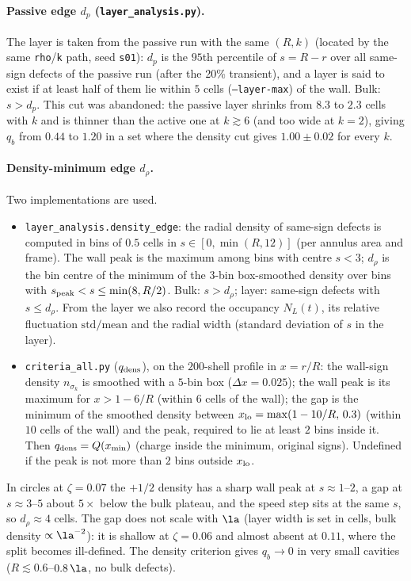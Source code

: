 \paragraph{Passive edge $d_p$ (\texttt{layer\_analysis.py}).}
The layer is taken from the passive run with the same $(R,k)$ (located by the same \texttt{rho}/\texttt{k}
path, seed \texttt{s01}): $d_p$ is the $95$th percentile of $s=R-r$ over all same-sign defects of the passive
run (after the 20\% transient), and a layer is said to exist if at least half of them lie within $5$ cells
(\texttt{--layer-max}) of the wall. Bulk: $s>d_p$. This cut was abandoned: the passive layer shrinks
from $8.3$ to $2.3$ cells with $k$ and is thinner than the active one at $k\gtrsim6$ (and too wide at $k=2$),
giving $q_b$ from $0.44$ to $1.20$ in a set where the density cut gives $1.00\pm0.02$ for every $k$.

\paragraph{Density-minimum edge $d_\rho$.}
Two implementations are used.
\begin{itemize}
  \item \texttt{layer\_analysis.density\_edge}: the radial density of same-sign defects is computed in
        bins of $0.5$ cells in $s\in[0,\min(R,12)]$ (per annulus area and frame). The wall peak is the
        maximum among bins with centre $s<3$; $d_\rho$ is the bin centre of the minimum of the $3$-bin box-smoothed
        density over bins with $s_{\rm peak}<s\le\min(8,R/2)$. Bulk: $s>d_\rho$; layer: same-sign defects with
        $s\le d_\rho$. From the layer we also record the occupancy $N_L(t)$, its relative fluctuation
        $\mathrm{std}/\mathrm{mean}$ and the radial width (standard deviation of $s$ in the layer).
  \item \texttt{criteria\_all.py} ($q_{\rm dens}$), on the $200$-shell profile in $x=r/R$: the wall-sign density
        $n_{\sigma_k}$ is smoothed with a $5$-bin box ($\Delta x=0.025$); the wall peak is its maximum for
        $x>1-6/R$ (within $6$ cells of the wall); the gap is the minimum of the smoothed density between
        $x_{\rm lo}=\max(1-10/R,\,0.3)$ (within $10$ cells of the wall) and the peak, required to lie at
        least $2$ bins inside it. Then $q_{\rm dens}=Q(x_{\min})$ (charge inside the minimum, original signs).
        Undefined if the peak is not more than $2$ bins outside $x_{\rm lo}$.
\end{itemize}
In circles at $\zeta=0.07$ the $+1/2$ density has a sharp wall peak at $s\approx1$--$2$, a gap at
$s\approx3$--$5$ about $5\times$ below the bulk plateau, and the speed step sits at the same $s$, so
$d_\rho\approx4$ cells. The gap does not scale with $\la$ (layer width is set in cells, bulk density
$\propto\la^{-2}$): it is shallow at $\zeta=0.06$ and almost absent at $0.11$, where the split becomes
ill-defined. The density criterion gives $q_b\to0$ in very small cavities ($R\lesssim0.6$--$0.8\,\la$,
no bulk defects).

